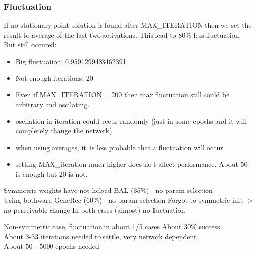 \subsubsection*{Fluctuation} 
\label{sec:generec-fluctuation}


If no stationary point solution is found after MAX\_ITERATION then we set the result to average of the last two activations. This lead to 80\% less fluctuation. But still occured: 
\begin{itemize}
\item Big fluctuation: 0.9591299483462391
\item Not enough iterations: 20
\item Even if MAX\_ITERATION = 200 then max fluctuation still could be arbitrary and oscilating.
\end{itemize} 

\begin{itemize} 
  \item oscilation in iteration could occur randomly (just in some epochs and it will completely change the network) 
  \item when using averages, it~is less probable that a fluctuation will occur 
  \item setting MAX\_iteration much higher does no t affect performance. About 50 is enough but 20 is not. 
\end{itemize} 
  
Symmetric weights have not helped BAL (35\%) - no param selection \\ 
Using bothward GeneRec (60\%) - no param selection 
  Forgot to symmetric init -> no perceivable change 
In both cases (almost) no fluctuation 

Non-symmetric case, fluctuation in about 1/5 cases 
  About 30\% success \\
  About 3-33 iterations needed to settle, very network dependent  \\
  About 50 - 5000 epochs needed  \\

